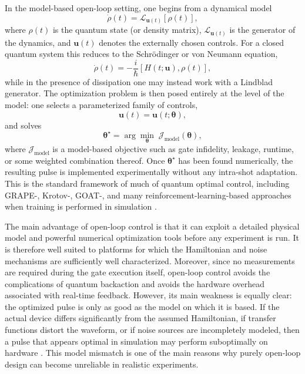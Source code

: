 In the model-based open-loop setting, one begins from a dynamical model
\begin{equation}
\dot{\rho}(t)
=
\mathcal{L}_{\bm{u}(t)}[\rho(t)],
\label{eq:open_loop_dynamics_general}
\end{equation}
where $\rho(t)$ is the quantum state (or density matrix), $\mathcal{L}_{\bm{u}(t)}$ is the generator of the dynamics, and $\bm{u}(t)$ denotes the externally chosen controls. For a closed quantum system this reduces to the Schr\"odinger or von Neumann equation,
\begin{equation}
\dot{\rho}(t)
=
-\frac{i}{\hbar}[H(t;\bm{u}),\rho(t)],
\label{eq:open_loop_vonneumann}
\end{equation}
while in the presence of dissipation one may instead work with a Lindblad generator. The optimization problem is then posed entirely at the level of the model: one selects a parameterized family of controls,
\begin{equation}
\bm{u}(t)=\bm{u}(t;\bm{\theta}),
\label{eq:open_loop_control_parametrization}
\end{equation}
and solves
\begin{equation}
\bm{\theta}^{\star}
=
\arg\min_{\bm{\theta}} \;
\mathcal{J}_{\mathrm{model}}(\bm{\theta}),
\label{eq:open_loop_optimization_problem}
\end{equation}
where $\mathcal{J}_{\mathrm{model}}$ is a model-based objective such as gate infidelity, leakage, runtime, or some weighted combination thereof. Once $\bm{\theta}^{\star}$ has been found numerically, the resulting pulse is implemented experimentally without any intra-shot adaptation. This is the standard framework of much of quantum optimal control, including GRAPE-, Krotov-, GOAT-, and many reinforcement-learning-based approaches when training is performed in simulation \cite{Koch2022}.

The main advantage of open-loop control is that it can exploit a detailed physical model and powerful numerical optimization tools before any experiment is run. It is therefore well suited to platforms for which the Hamiltonian and noise mechanisms are sufficiently well characterized. Moreover, since no measurements are required during the gate execution itself, open-loop control avoids the complications of quantum backaction and avoids the hardware overhead associated with real-time feedback. However, its main weakness is equally clear: the optimized pulse is only as good as the model on which it is based. If the actual device differs significantly from the assumed Hamiltonian, if transfer functions distort the waveform, or if noise sources are incompletely modeled, then a pulse that appears optimal in simulation may perform suboptimally on hardware \cite{Koch2022,Ferrie2015}. This model mismatch is one of the main reasons why purely open-loop design can become unreliable in realistic experiments.

